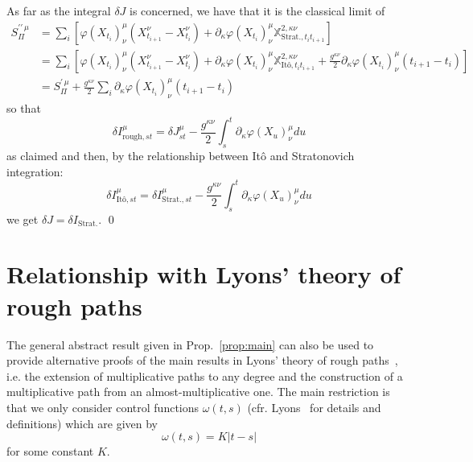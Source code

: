 \documentclass[a4paper,12pt,reqno]{amsproc}
\newcommand{\der}{\delta\!}
\begin{document}
As far as the integral $\der J$ is concerned, we have that it is the
classical limit of
\begin{equation*}
  \begin{split}
S^{\prime\prime\,\mu}_\Pi & = \sum_i \left[\varphi(X_{t_i})^\mu_\nu (X^\nu_{t_{i+1}}-X^\nu_{t_i})
+ \partial_\kappa \varphi(X_{t_i})^\mu_\nu \mathbb{X}^{2,\kappa\nu}_{\text{Strat.},t_i
  t_{i+1}}\right]
\\ & = 
\sum_i \left[\varphi(X_{t_i})^\mu_\nu (X^\nu_{t_{i+1}}-X^\nu_{t_i})
+ \partial_\kappa \varphi(X_{t_i})^\mu_\nu \mathbb{X}^{2,\kappa\nu}_{\text{It\^o},t_i
  t_{i+1}} + \frac{g^{\kappa\nu}}{2} \partial_\kappa  \varphi(X_{t_i})^\mu_\nu (t_{i+1}-t_i)
\right] 
\\ & = S^{\prime\,\mu}_\Pi + 
 \frac{g^{\kappa\nu}}{2}\sum_i  \partial_\kappa  \varphi(X_{t_i})^\mu_\nu (t_{i+1}-t_i)
  \end{split}
\end{equation*}
so that $$
\der I^\mu_{\text{rough},st} = \der J^\mu_{st} - \frac{g^{\kappa\nu}}{2}\int_s^t \partial_\kappa  \varphi(X_u)^\mu_\nu du
 $$
as claimed
and then, by the relationship between It\^o  and Stratonovich
integration:
$$
\der I_{\text{It\^o},st}^\mu = \der I_{\text{Strat.},st}^\mu - \frac{g^{\kappa\nu}}{2}\int_s^t \partial_\kappa  \varphi(X_u)^\mu_\nu du
$$
 we get $\der J = \der I_{\text{Strat.}}$. \qed





\section{Relationship with Lyons' theory of rough paths}
\label{sec:lyons}

The general abstract result given in Prop.~\ref{prop:main} can also be used to provide alternative proofs
of the main results in Lyons' theory of rough paths~\cite{Lyons},
i.e. the extension of multiplicative paths to any degree and the
construction of a multiplicative path from an almost-multiplicative
one. The main restriction is that we only consider control functions
$\omega(t,s)$ (cfr. Lyons~\cite{Lyons} for details and definitions)
which are given by
$$
\omega(t,s) = K |t-s|
$$
for some constant $K$. 
\end{document}
